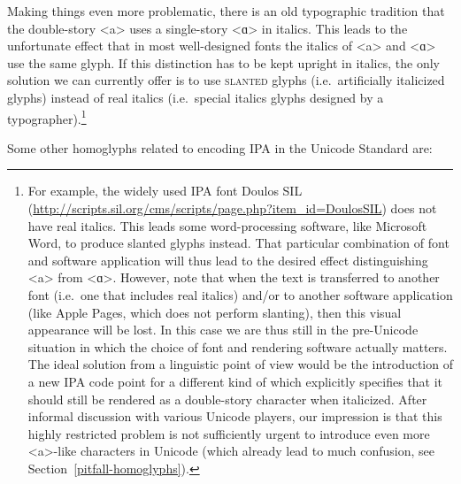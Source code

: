 Making things even more problematic, there is an old typographic tradition that
the double-story <a> uses a single-story <ɑ> in italics. This leads to the
unfortunate effect that in most well-designed fonts the italics of <a> and <ɑ>
use the same glyph. If this distinction has to be kept upright in italics, the
only solution we can currently offer is to use \textsc{slanted} glyphs
(i.e.~artificially italicized glyphs) instead of real italics (i.e.~special
italics glyphs designed by a typographer).\footnote{For example, the widely used
IPA font Doulos SIL
(\url{http://scripts.sil.org/cms/scripts/page.php?item\_id=DoulosSIL}) does not
have real italics. This leads some word-processing software, like Microsoft
Word, to produce slanted glyphs instead. That particular combination of font and
software application will thus lead to the desired effect distinguishing <a>
from <ɑ>. However, note that when the text is transferred to another font
(i.e.~one that includes real italics) and/or to another software application
(like Apple Pages, which does not perform slanting), then this visual appearance
will be lost. In this case we are thus still in the pre-Unicode situation in
which the choice of font and rendering software actually matters. The ideal
solution from a linguistic point of view would be the introduction of a new IPA
code point for a different kind of which explicitly specifies that it should
still be rendered as a double-story character when italicized. After informal
discussion with various Unicode players, our impression is that this highly
restricted problem is not sufficiently urgent to introduce even more <a>-like
characters in Unicode (which already lead to much confusion, see Section~\ref{pitfall-homoglyphs}).}

Some other homoglyphs related to encoding IPA in the Unicode Standard are:

